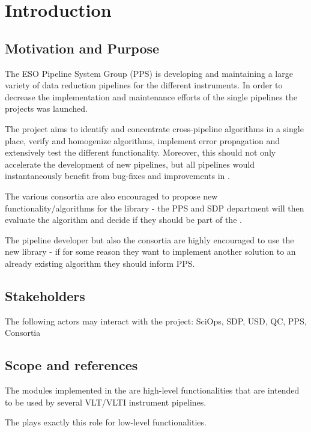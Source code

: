 \begingroup
\let\cleardoublepage\relax
\let\clearpage\relax

\section{Introduction}

\subsection{Motivation and Purpose}

The ESO Pipeline System Group (PPS) is developing and maintaining
a large variety of data reduction pipelines for the different
instruments. In order to decrease the implementation and maintenance
efforts of the single pipelines the \HDRL projects was launched. 

The \HDRL project aims to identify and concentrate cross-pipeline
algorithms in a single place, verify and homogenize algorithms,
implement error propagation and extensively test the different
functionality. Moreover, this should not only accelerate the
development of new pipelines, but all pipelines would instantaneously
benefit from bug-fixes and improvements in \HDRL.


The various consortia are also encouraged to propose new
functionality/algorithms for the library - the PPS and SDP department
will then evaluate the algorithm and decide if they should be part of
the \HDRL.

The pipeline developer but also the consortia are highly encouraged to
use the new library - if for some reason they want to implement
another solution to an already existing algorithm they should inform
PPS.



\subsection{Stakeholders}

The following actors may interact with the \HDRL project:
SciOps, SDP, USD, QC, PPS, Consortia


\subsection{Scope and references}

The modules implemented in the \HDRL are high-level functionalities that
are intended to be used by several VLT/VLTI instrument pipelines.

The \CPL plays exactly this role for low-level functionalities. 

\endgroup
